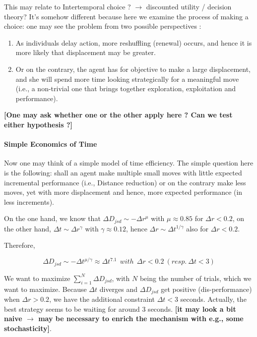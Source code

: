 This may relate to Intertemporal choice ? $\rightarrow$ discounted utility / decision theory? It's somehow different because here we examine the process of making a choice: one may see the problem from two possible perspectives : 

\begin{enumerate}
  \item As individuals delay action, more reshuffling (renewal) occurs, and hence it is more likely that displacement may be greater.
  \item Or on the contrary, the agent has for objective to make a large displacement, and she will spend more time looking strategically for a meaningful move (i.e., a non-trivial one that brings together exploration, exploitation and performance).
\end{enumerate}

{\bf [One may ask whether one or the other apply here ? Can we test either hypothesis ?]}


\paragraph{Simple Economics of Time}
Now one may think of a simple model of time efficiency. The simple question here is the following: shall an agent make multiple small moves with little expected incremental performance (i.e., Distance reduction) or on the contrary make less moves, yet with more displacement and hence, more expected performance (in less increments).

On the one hand, we know that $\Delta D_{jsd} \sim - \Delta r ^{\mu}$ with $\mu \approx 0.85$ for $\Delta r < 0.2$, on the other hand, $\Delta t \sim \Delta r^{\gamma}$ with $\gamma \approx 0.12$, hence $\Delta r \sim \Delta t^{1/\gamma}$ also for $\Delta r < 0.2$.

Therefore, 

\begin{equation}
\Delta D_{jsd} \sim -  \Delta t^{\mu / \gamma} \approx \Delta t^{7.1}~~with~~\Delta r < 0.2~(resp.~\Delta t  < 3)
\end{equation}

We want to maximize $\sum_{i=1}^{N} \Delta D_{jsd}$, with $N$ being the number of trials, which we want to maximize. Because $\Delta t$ diverges and $\Delta D_{jsd}$ get positive (dis-performance) when $\Delta r > 0.2$, we have the additional constraint $\Delta t  < 3$ seconds. Actually, the best strategy seems to be waiting for around 3 seconds. {\bf [it may look a bit naive $\rightarrow$ may be necessary to enrich the mechanism with e.g., some stochasticity]}.


